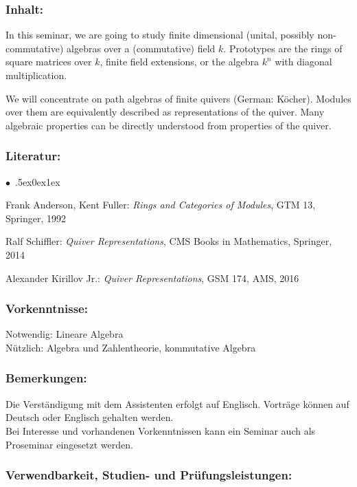 \documentclass[a4paper,10pt]{article}
\renewenvironment{itemize}{\begin{list}{$\bullet$\ }{\itemsep.5ex\setlength{\topsep}{0.5\itemsep}\parsep0ex\labelsep1ex\settowidth{\labelwidth}{$\bullet$\ }\setlength{\leftmargin}{\labelwidth}\addtolength{\leftmargin}{3ex}\addtolength{\leftmargin}{\labelsep}}}{\end{list}}
\begin{document}
\subsubsection*{\large
    Inhalt:
}
In this seminar, we are going to study finite dimensional (unital, possibly non-commutative) algebras over a (commutative) field $k$. Prototypes are the rings of square matrices over $k$, finite field extensions, or the algebra $k^n$ with diagonal multiplication. 

We will concentrate on path algebras of finite quivers (German: Köcher). Modules over them are equivalently described as representations of the quiver. Many algebraic properties can be directly understood from properties of the quiver. 

\subsubsection*{\large
    Literatur:
}
\begin{itemize}
\item
Frank Anderson, Kent Fuller: \emph{Rings and Categories of Modules}, GTM 13, Springer, 1992 
\item
Ralf Schiffler: \emph{Quiver Representations}, CMS Books in Mathematics, Springer, 2014 
\item
Alexander Kirillov Jr.: \emph{Quiver Representations}, GSM 174, AMS, 2016
\end{itemize}
\subsubsection*{\large
    Vorkenntnisse:
}
Notwendig: Lineare Algebra \\
Nützlich: Algebra und Zahlentheorie, kommutative Algebra
\subsubsection*{\large
    Bemerkungen:
}
Die Verständigung mit dem Assistenten erfolgt auf Englisch. Vorträge können auf Deutsch oder Englisch gehalten werden. \\
Bei Interesse und vorhandenen Vorkenntnissen kann ein Seminar auch als Proseminar eingesetzt werden.
\cleardoublepage
\subsubsection*{\large
    Verwendbarkeit, Studien- und Prüfungsleistungen:
}
\end{document}
